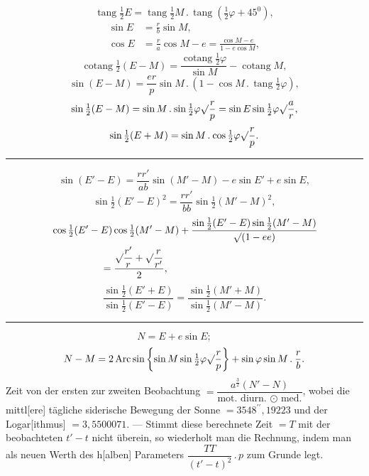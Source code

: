\clearpage
{}
\begin{center}
\end{center}
\[
\operatorname{tang}\tfrac12E=\operatorname{tang}\tfrac12M\mathbin{.}\operatorname{tang}(\tfrac12\varphi+45^{0}),
\]
\[
\begin{aligned}
\sin E&=\frac rb\sin M,\\
\cos E&=\frac ra\cos M-e=\frac{\cos M-e}{1-e\cos M},
\end{aligned}
\]
\[
\operatorname{cotang}\tfrac12(E-M)=\frac{\operatorname{cotang}\frac12\varphi}{\sin M}-\operatorname{cotang}M,
\]
\[
\sin(E-M)=\frac{er}{p}\sin M\mathbin{.}(1-\cos M\mathbin{.}\operatorname{tang}\tfrac12\varphi),
\]
\[
\sin\tfrac12(E-M)=\sin M\mathbin{.}\sin\tfrac12\varphi\surd\frac rp=\sin E\sin\tfrac12\varphi\surd\frac ar,
\]
\[
\sin\tfrac12(E+M)=\sin M\mathbin{.}\cos\tfrac12\varphi\surd\frac rp.
\]
\begin{center}\rule{.18\linewidth}{.35pt}\end{center}
\[
\sin(E'-E)=\frac{rr'}{ab}\sin(M'-M)-e\sin E'+e\sin E,
\]
\[
\sin\tfrac12(E'-E)^2=\frac{rr'}{bb}\sin\tfrac12(M'-M)^2,
\]
\[
\begin{aligned}
&\cos\tfrac12(E'-E)\cos\tfrac12(M'-M)
+\frac{\sin\frac12(E'-E)\sin\frac12(M'-M)}{\surd(1-ee)}\\
&\hspace{5em}=\frac{\surd\dfrac{r'}r+\surd\dfrac r{r'}}2,
\end{aligned}
\]
\[
\frac{\sin\frac12(E'+E)}{\sin\frac12(E'-E)}=\frac{\sin\frac12(M'+M)}{\sin\frac12(M'-M)}.
\]
\begin{center}\rule{.18\linewidth}{.35pt}\end{center}
\[
N=E+e\sin E;\qquad
\]
\[
N-M=2\operatorname{Arc}\sin\left\{\sin M\sin\tfrac12\varphi\surd\frac rp\right\}+\sin\varphi\sin M\mathbin{.}\frac rb.
\]
\noindent Zeit von der ersten zur zweiten Beobachtung $=\dfrac{a^{\frac32}(N'-N)}{\text{mot. diurn. }\odot\text{ med.}}$, wobei die mittl[ere] tägliche siderische Bewegung der Sonne $=3548^{\prime\prime}{,}19223$ und der Logar[ithmus] $=3{,}5500071$. — Stimmt diese berechnete Zeit $=T$ mit der beobachteten $t'-t$ nicht überein, so wiederholt man die Rechnung, indem man als neuen Werth des h[alben] Parameters $\dfrac{TT}{(t'-t)^2}\mathbin{.}p$ zum Grunde legt.
\clearpage\endgroup

